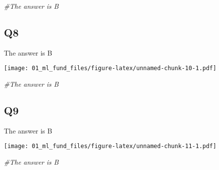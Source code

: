 \documentclass[
]{article}
\newenvironment{Shaded}{\begin{snugshade}}{\end{snugshade}}
\newcommand{\CommentTok}[1]{\textcolor[rgb]{0.56,0.35,0.01}{\textit{#1}}}
\newcommand{\KeywordTok}[1]{\textcolor[rgb]{0.13,0.29,0.53}{\textbf{#1}}}
\newcommand{\NormalTok}[1]{#1}
\newcommand{\OperatorTok}[1]{\textcolor[rgb]{0.81,0.36,0.00}{\textbf{#1}}}
\newcommand{\StringTok}[1]{\textcolor[rgb]{0.31,0.60,0.02}{#1}}
\begin{document}
\begin{Shaded}
\begin{Highlighting}[]
\CommentTok{#The answer is B}
\end{Highlighting}
\end{Shaded}

\hypertarget{q8}{%
\subsection{Q8}\label{q8}}

The answer is B

\begin{Shaded}
\end{Shaded}

\texttt{[image: 01\_ml\_fund\_files/figure-latex/unnamed-chunk-10-1.pdf]}

\begin{Shaded}
\begin{Highlighting}[]
\CommentTok{#The answer is B}
\end{Highlighting}
\end{Shaded}

\hypertarget{q9}{%
\subsection{Q9}\label{q9}}

The answer is B

\begin{Shaded}
\end{Shaded}

\texttt{[image: 01\_ml\_fund\_files/figure-latex/unnamed-chunk-11-1.pdf]}

\begin{Shaded}
\begin{Highlighting}[]
\CommentTok{#The answer is B}
\end{Highlighting}
\end{Shaded}
\end{document}
